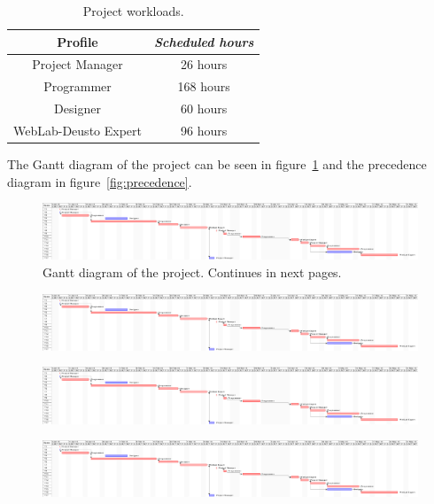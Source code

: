 \begin{table}[h]
	\centering
	\caption{Project workloads.}\label{tab:work}
	\begin{tabular}{cc}
		\toprule
		\textbf{Profile} & \emph{Scheduled hours} \\
		\midrule
		Project Manager			&	26 hours	\\
		Programmer				&	168 hours	\\
		Designer				&	60 hours	\\
		WebLab-Deusto Expert	&	96 hours	\\
		\bottomrule
	\end{tabular}
\end{table}

The Gantt diagram of the project can be seen in figure~\ref{fig:gantt} and the precedence diagram in
figure~\ref{fig:precedence}.

\TOin\textheight

\clearpage
\begin{figure}
	\centering
	\includegraphics[trim=0in 0in 26in 0in, clip, angle=90]{fig/gantt}
	\caption{Gantt diagram of the project. Continues in next pages.}\label{fig:gantt}
\end{figure}
\clearpage

\begin{figure}
	\centering
	\includegraphics[trim=7.82in 0in 17in 0in, clip, angle=90]{fig/gantt}
\end{figure}
\clearpage

\begin{figure}
	\centering
	\includegraphics[trim=16.82in 0in 8in 0in, clip, angle=90]{fig/gantt}
\end{figure}
\clearpage

\begin{figure}
	\centering
	\includegraphics[trim=25.82in 0in 0in 0in, clip, angle=90]{fig/gantt}
\end{figure}
\clearpage


